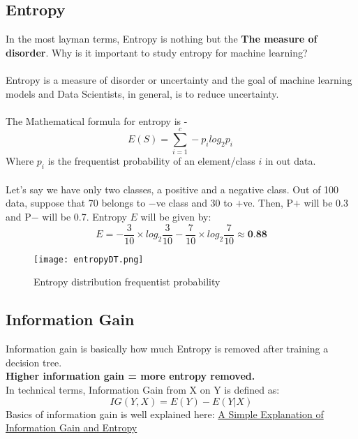 \subsection{Entropy}
    In the most layman terms, Entropy is nothing but the \textbf{The measure of disorder}.
    Why is it important to study entropy for machine learning? \\
    \\ Entropy is a measure of disorder or uncertainty and the goal of machine learning models and Data Scientists, in general, is to reduce uncertainty.\\
    \\ The Mathematical formula for entropy is - 
    \begin{equation}\label {eq:entropy}
        E(S) = \sum_{i=1}^c - p_i log_2 p_i\
    \end{equation}
    Where $p_i$ is the frequentist probability of an element/class $i$ in out data.\\
    \\ Let's say we have only two classes, a positive and a negative class. Out of 100 data, suppose that 70 belongs to $-$ve class and 30 to $+$ve. Then, P$+$ will be 0.3 and P$-$ will be 0.7.
    \vspace{4mm}
    Entropy $E$ will be given by:
    \begin{equation}
        E = -\frac{3}{10} \times log_2{\frac{3}{10}}-\frac{7}{10} \times log_2{\frac{7}{10}} \approx \textbf{0.88}
    \end{equation}
    \begin{figure}[h]
        \centering
        \texttt{[image: entropyDT.png]}
        \caption{Entropy distribution frequentist probability}
    \end{figure}

\subsection{Information Gain}
    Information gain is basically how much Entropy is removed after training a decision tree.\\
    \textbf{Higher information gain = more entropy removed.}\\
    In technical terms, Information Gain from X on Y is defined as:
    \begin{equation}\label{eq:inforamtion gain}
        IG(Y,X) = E(Y) - E(Y|X)
    \end{equation}
    Basics of information gain is well explained here: \href{https://victorzhou.com/blog/information-gain/}{A Simple Explanation of Information Gain and Entropy}

